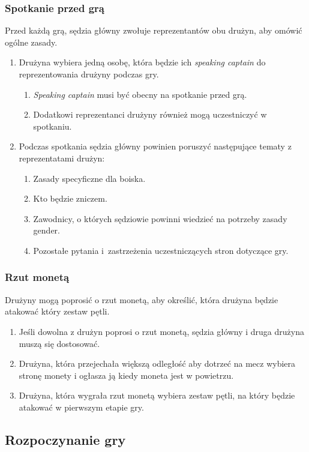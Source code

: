 \documentclass[11pt,a4paper]{article}
\begin{document}
\subsubsection{Spotkanie przed grą}
Przed każdą grą, sędzia główny zwołuje reprezentantów obu drużyn, aby omówić ogólne zasady.
\begin{enumerate}
  \item Drużyna wybiera jedną osobę, która będzie ich \emph{speaking captain} do reprezentowania drużyny podczas gry.
  \begin{enumerate}
    \item \emph{Speaking captain} musi być obecny na spotkanie przed grą.
    \item Dodatkowi reprezentanci drużyny również mogą uczestniczyć w spotkaniu.
  \end{enumerate}
  \item Podczas spotkania sędzia główny powinien poruszyć następujące tematy z reprezentatami drużyn:
  \begin{enumerate}
    \item Zasady specyficzne dla boiska.
    \item Kto będzie zniczem.
    \item Zawodnicy, o których sędziowie powinni wiedzieć na potrzeby zasady gender.
    \item Pozostałe pytania i~zastrzeżenia uczestniczących stron dotyczące gry.
  \end{enumerate}
\end{enumerate}

\subsubsection{Rzut monetą}
Drużyny mogą poprosić o rzut monetą, aby określić, która drużyna będzie atakować który zestaw pętli.
\begin{enumerate}
  \item Jeśli dowolna z drużyn poprosi o rzut monetą, sędzia główny i druga drużyna muszą się dostosować.
  \item Drużyna, która przejechała większą odległość aby dotrzeć na mecz wybiera stronę monety i ogłasza ją kiedy moneta jest w powietrzu.
  \item Drużyna, która wygrała rzut monetą wybiera zestaw pętli, na który będzie atakować w pierwszym etapie gry.
\end{enumerate}

\subsection{Rozpoczynanie gry}
\end{document}
